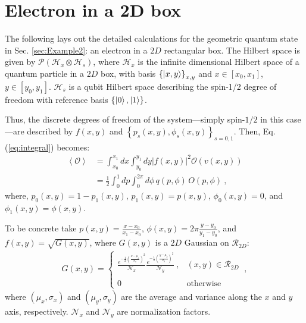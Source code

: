 \documentclass[draft,nofootinbib,pre,twocolumn,showkeys,superscriptaddress,preprintnumbers,floatfix]{revtex4-1}
\newcommand{\1}{\mathbbm{1}}
\newcommand{\MV}[1]{\left\langle #1 \right\rangle}
\begin{document}
\section{Electron in a 2D box}

The following lays out the detailed calculations for the geometric quantum
state in Sec. \ref{sec:Example2}: an electron in a $2D$ rectangular box. The
Hilbert space is given by $\mathcal{P}(\mathcal{H}_x \otimes \mathcal{H}_s)$,
where $\mathcal{H}_x$ is the infinite dimensional Hilbert space of a quantum
particle in a $2D$ box, with basis $\left\{\ket{x,y} \right\}_{x,y}$ and $x \in
[x_0,x_1]$, $y \in [y_0,y_1]$. $\mathcal{H}_s$ is a qubit Hilbert space
describing the spin-1/2 degree of freedom with reference basis
$\left\{\ket{0},\ket{1}\right\}$.
 
Thus, the discrete degrees of freedom of the system---simply spin-$1/2$ in this
case---are described by $f(x,y)$ and $\left\{p_s(x,y),
\phi_s(x,y)\right\}_{s=0,1}$. Then, Eq. (\ref{eq:integral}) becomes:
\begin{align*}
\MV{\mathcal{O}} & = \int_{x_0}^{x_1} \!\!\! dx \int_{y_0}^{y_1} \!\!\!dy
  |f(x,y)|^2 \mathcal{O}(v(x,y)) \\
  & = \frac{1}{2}\int_0^1 \!\!\!dp \int_0^{2\pi}\!\!\!\!\!d\phi \, q(p,\phi) \, O(p,\phi)
  ~,
\end{align*}
where, $p_0(x,y) = 1 - p_1(x,y)$, $p_1(x,y) = p(x,y)$, $\phi_0(x,y) = 0$, and $\phi_1(x,y) = \phi(x,y)$.

To be concrete take $p(x,y) = \frac{x-x_0}{x_1-x_0}$, $\phi(x,y) =
2\pi\frac{y-y_0}{y_1-y_0}$, and $ f(x,y) = \sqrt{G(x,y)}$, where $G(x,y)$ is a
$2D$ Gaussian on $\mathcal{R}_{2D}$:
\begin{align*}
G(x,y) = \left\{ \begin{array}{ll} 
	\frac{e^{-\frac{1}{2}\left( \frac{x-\mu_x}{\sigma_x}\right)^2}}{\mathcal{N}_x} \frac{e^{-\frac{1}{2}\left( \frac{y-\mu_y}{\sigma_y}\right)^2}}{\mathcal{N}_y}~, & (x,y) \in \mathcal{R}_{2D} \\
	& \\
	0 & \textrm{otherwise}
	\end{array} \right.
  ~,
\end{align*}
where $(\mu_x,\sigma_x)$ and $(\mu_y,\sigma_y)$ are the average and variance
along the $x$ and $y$ axis, respectively. $\mathcal{N}_x$ and $\mathcal{N}_y$
are normalization factors.
\end{document}

